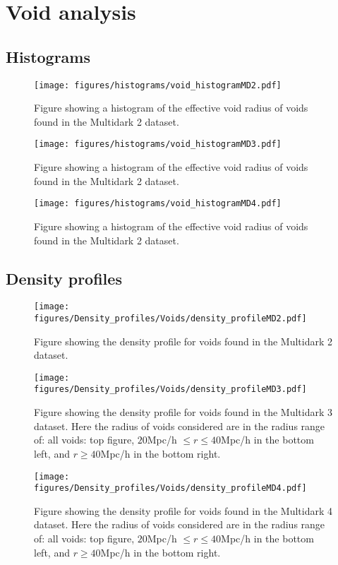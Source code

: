 \section{Void analysis}
\subsection{Histograms}
\begin{figure}[htbp]\label{fig:histMD2}
    \texttt{[image: figures/histograms/void\_histogramMD2.pdf]}
    \caption{Figure showing a histogram of the effective void radius of voids found in the Multidark 2 dataset.}
\end{figure}
\begin{figure}[htbp]\label{fig:histMD3}
    \texttt{[image: figures/histograms/void\_histogramMD3.pdf]}
    \caption{Figure showing a histogram of the effective void radius of voids found in the Multidark 2 dataset.}
\end{figure}
\begin{figure}[htbp]\label{fig:histMD4}
    \texttt{[image: figures/histograms/void\_histogramMD4.pdf]}
    \caption{Figure showing a histogram of the effective void radius of voids found in the Multidark 2 dataset.}
\end{figure}
\subsection{Density profiles}

\begin{figure}[htbp]\label{fig:deltaMD2}
    \texttt{[image: figures/Density\_profiles/Voids/density\_profileMD2.pdf]}
    \caption{Figure showing the density profile for voids found in the Multidark 2 dataset.}
\end{figure}
\begin{figure}[htbp]\label{fig:deltaMD3}
    \texttt{[image: figures/Density\_profiles/Voids/density\_profileMD3.pdf]}
    \caption{Figure showing the density profile for voids found in the Multidark 3 dataset. Here the radius of voids considered are in the radius range of: all voids: top figure, $20$Mpc/h $\leq r\leq 40$Mpc/h in the bottom left, and $r\geq 40$Mpc/h in the bottom right.}
\end{figure}
\begin{figure}[htbp]\label{fig:deltaMD4}
    \texttt{[image: figures/Density\_profiles/Voids/density\_profileMD4.pdf]}
    \caption{Figure showing the density profile for voids found in the Multidark 4 dataset. Here the radius of voids considered are in the radius range of: all voids: top figure, $20$Mpc/h $\leq r\leq 40$Mpc/h in the bottom left, and $r\geq 40$Mpc/h in the bottom right.}
\end{figure}

